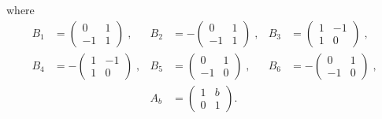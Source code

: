 where
\begin{align*}
  B_1&=\begin{pmatrix}
    0 & 1 \\
    -1 & 1
  \end{pmatrix}\; ,
 &B_2&=-\begin{pmatrix}
   0 & 1 \\
   -1 & 1
 \end{pmatrix}\; ,
 &B_3&=\begin{pmatrix}
   1 & -1 \\
   1 & 0
 \end{pmatrix}\; , \\
  B_4&=-\begin{pmatrix}
    1 & -1 \\
    1 & 0
  \end{pmatrix}\; ,
 &B_5&=\begin{pmatrix}
   0 & 1 \\
   -1 & 0
 \end{pmatrix}\; ,
 &B_6&=-\begin{pmatrix}
   0 & 1 \\
   -1 & 0
 \end{pmatrix}\; , \\
 &&A_b&=\begin{pmatrix}
   1 & b \\
   0 & 1
 \end{pmatrix}.
\end{align*}


